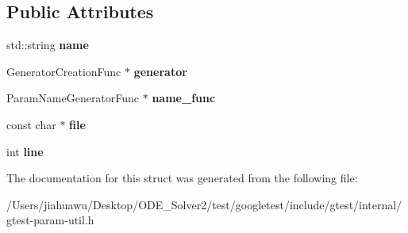 \subsection*{Public Attributes}
\begin{DoxyCompactItemize}
\item 
\mbox{\label{structtesting_1_1internal_1_1_parameterized_test_case_info_1_1_instantiation_info_a299bc66e22b5c78481fda01ef5a4c73d}} 
std\+::string {\bfseries name}
\item 
\mbox{\label{structtesting_1_1internal_1_1_parameterized_test_case_info_1_1_instantiation_info_a4c2dbdd0c8f50ff2d5c58c72b364e9a0}} 
Generator\+Creation\+Func $\ast$ {\bfseries generator}
\item 
\mbox{\label{structtesting_1_1internal_1_1_parameterized_test_case_info_1_1_instantiation_info_a78a1508dbcc1718bd3dc6001f45ae2ae}} 
Param\+Name\+Generator\+Func $\ast$ {\bfseries name\+\_\+func}
\item 
\mbox{\label{structtesting_1_1internal_1_1_parameterized_test_case_info_1_1_instantiation_info_a2e8aabfbee50377662389fc609222dc4}} 
const char $\ast$ {\bfseries file}
\item 
\mbox{\label{structtesting_1_1internal_1_1_parameterized_test_case_info_1_1_instantiation_info_af3f6efd51f0047a3d1f649504c1f3fa1}} 
int {\bfseries line}
\end{DoxyCompactItemize}


The documentation for this struct was generated from the following file\+:\begin{DoxyCompactItemize}
\item 
/\+Users/jiahuawu/\+Desktop/\+O\+D\+E\+\_\+\+Solver2/test/googletest/include/gtest/internal/gtest-\/param-\/util.\+h\end{DoxyCompactItemize}
